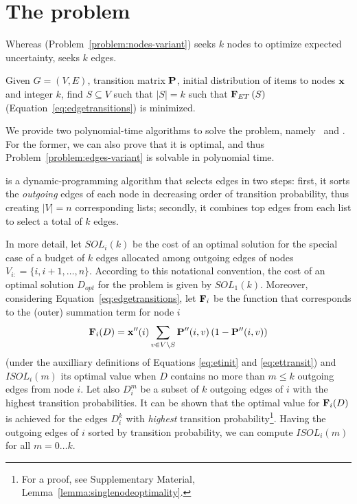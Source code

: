 \section{The \variant{\edgetransitions} problem}
\label{sec:edges}

Whereas \variant{\nodeitems} (Problem~\ref{problem:nodes-variant}) seeks $k$ 
nodes to optimize expected uncertainty, \variant{\edgetransitions} seeks
$k$ edges.
\begin{problem}[{\edgeproblem}]
Given $G=(V,E)$, transition matrix $\mathbf{P}$, 
initial distribution of items to nodes
$\mathbf{x}$ and integer $k$, find
$S\subseteq V$ such that $|S|=k$ such that 
$\mathbf{F}_{\sc ET}\left(S\right)$
(Equation~\eqref{eq:edgetransitions}) is minimized.
\label{problem:edges-variant}
\end{problem}
We provide two polynomial-time algorithms to solve
the problem, namely \edgeDP\ and \edgegreedy.
For the former, we can also prove that it is optimal, and thus Problem~\ref{problem:edges-variant}
is solvable in polynomial time.

{\edgeDP} is a dynamic-programming algorithm that 
selects edges in two steps: first, it sorts the {\it outgoing} 
edges of
each node in decreasing order of transition probability, thus
creating $|V| = n$ corresponding lists; secondly, it combines top edges from
each list to select a total of $k$ edges.

In more detail, let $SOL_i(k)$ be the cost
of an optimal solution for the special case of
a budget of $k$ edges allocated among outgoing edges of nodes
$V_{i:} = \{i, i+1, \ldots, n\}$.
According to this notational convention,
the cost of an optimal solution $D_{opt}$ for the problem is given by 
$SOL_1(k)$.
Moreover, considering Equation~\eqref{eq:edgetransitions},
let $\mathbf{F}_i$ be the function that corresponds to
the (outer) summation term for node $i$
\begin{equation}
	\mathbf{F}_i(D) = \mathbf{x}^{\prime\prime}(i)\sum_{v\in V\setminus S}\mathbf{P}^{\prime\prime}(i,v)\left(1-\mathbf{P}^{\prime\prime}(i,v)\right)
\end{equation}
(under the auxilliary definitions of Equations \eqref{eq:etinit}
and \eqref{eq:ettransit})
and $ISOL_i(m)$ its optimal value when $D$ contains no more than
$m\leq k$ outgoing edges from node $i$.
Let also $D_i^m$ be a subset of $k$ outgoing edges of $i$
with the highest transition
probabilities.
It can be shown that the optimal value
for $\mathbf{F}_i(D)$ is achieved for 
the edges $D_i^k$ with {\it highest} transition 
probability\footnote{For a proof,
see Supplementary Material, Lemma~\ref{lemma:singlenodeoptimality}.}.
Having the outgoing edges of $i$ sorted by transition probability,
we can compute $ISOL_i(m)$ for all $m = 0\ldots k$.

